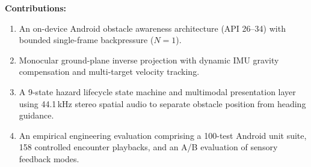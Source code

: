 \textbf{Contributions:}
\begin{enumerate}
    \item An on-device Android obstacle awareness architecture (API 26--34) with bounded single-frame backpressure ($N=1$).
    \item Monocular ground-plane inverse projection with dynamic IMU gravity compensation and multi-target velocity tracking.
    \item A 9-state hazard lifecycle state machine and multimodal presentation layer using 44.1\,kHz stereo spatial audio to separate obstacle position from heading guidance.
    \item An empirical engineering evaluation comprising a 100-test Android unit suite, 158 controlled encounter playbacks, and an A/B evaluation of sensory feedback modes.
\end{enumerate}
